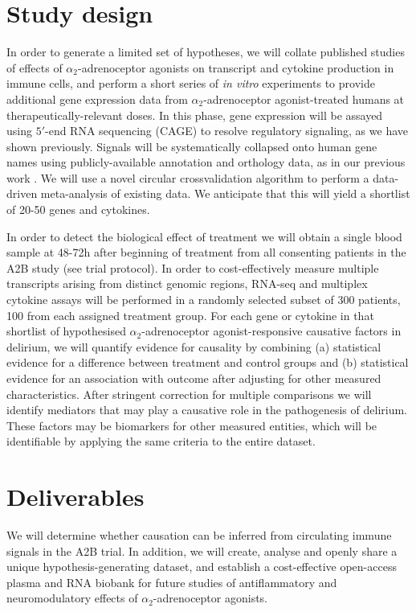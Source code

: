 \documentclass[a4paper,11pt,onecolumn]{IEEEtran}
\newcommand{\ataa}{$\alpha_2$-adrenoceptor agonist\xspace}
\newcommand{\ataas}{$\alpha_2$-adrenoceptor agonists\xspace}
\begin{document}
\section*{Study design}
In order to generate a limited set of hypotheses, we will collate published studies of effects of \ataas on transcript and cytokine production in immune cells, and perform a short series of \emph{in vitro} experiments to provide additional gene expression data from \ataa-treated humans at therapeutically-relevant doses. In this phase, gene expression will be assayed using $5'$-end RNA sequencing (CAGE) to resolve regulatory signaling, as we have shown previously\cite{fantom5biblatex}. Signals will be systematically collapsed onto human gene names using publicly-available annotation and orthology data, as in our previous work \cite{schroder_conservation_2012}. We will use a novel circular crossvalidation algorithm to perform a data-driven meta-analysis of existing data. We anticipate that this will yield a shortlist of 20-50 genes and cytokines.\par
In order to detect the biological effect of treatment we will obtain a single blood sample at 48-72h after beginning of treatment from all consenting patients in the A2B study (see trial protocol). In order to cost-effectively measure multiple transcripts arising from distinct genomic regions, RNA-seq and multiplex cytokine assays will be performed in a randomly selected subset of 300 patients, 100 from each assigned treatment group. For each gene or cytokine in that shortlist of hypothesised \ataa-responsive causative factors in delirium, we will quantify evidence for causality by combining (a) statistical evidence for a difference between treatment and control groups and (b) statistical evidence for an association with outcome after adjusting for other measured characteristics. After stringent correction for multiple comparisons we will identify mediators that may play a causative role in the pathogenesis of delirium. These factors may be biomarkers for other measured entities, which will be identifiable by applying the same criteria to the entire dataset. 
\par

\section*{Deliverables}
We will determine whether causation can be inferred from circulating immune signals in the A2B trial. In addition, we will create, analyse and openly share a unique hypothesis-generating dataset, and establish a cost-effective open-access plasma and RNA biobank for future studies of antiflammatory and neuromodulatory effects of \ataas. \par

\printbibliography
\end{document}

